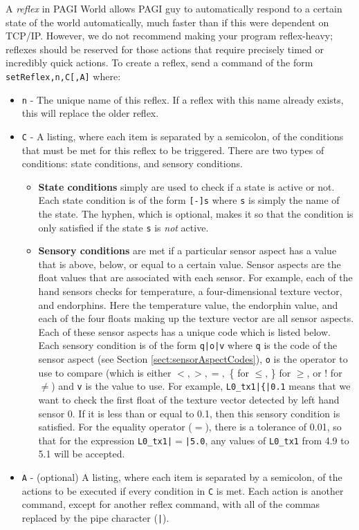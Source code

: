 A \textit{reflex} in PAGI World allows PAGI guy to automatically respond to a certain state of the world automatically, much faster than if this were dependent on TCP/IP. However, we do not recommend making your program reflex-heavy; reflexes should be reserved for those actions that require precisely timed or incredibly quick actions. To create a reflex, send a command of the form \texttt{setReflex,n,C[,A]} where:

\begin{itemize}
\item \texttt{n} - The unique name of this reflex. If a reflex with this name already exists, this will replace the older reflex.
\item \texttt{C} - A listing, where each item is separated by a semicolon, of the conditions that must be met for this reflex to be triggered. There are two types of conditions: state conditions, and sensory conditions. 
	\begin{itemize}
	\item \textbf{State conditions} simply are used to check if a state is active or not. Each state condition is of the form \texttt{[-]s} where \texttt{s} is simply the name of the state. The hyphen, which is optional, makes it so that the condition is only satisfied if the state \texttt{s} is \textit{not} active.
	\item \textbf{Sensory conditions} are met if a particular sensor aspect has a value that is above, below, or equal to a certain value. Sensor aspects are the float values that are associated with each sensor. For example, each of the hand sensors checks for temperature, a four-dimensional texture vector, and endorphins. Here the temperature value, the endorphin value, and each of the four floats making up the texture vector are all sensor aspects. Each of these sensor aspects has a unique code which is listed below.\\
	Each sensory condition is of the form \texttt{q|o|v} where \texttt{q} is the code of the sensor aspect (see Section \ref{sect:sensorAspectCodes}), \texttt{o} is the operator to use to compare (which is either $<, >, =,$ \{ for $\leq$, \} for $\geq$, or ! for $\neq$) and \texttt{v} is the value to use. For example, \texttt{L0\_tx1|\{|0.1} means that we want to check the first float of the texture vector detected by left hand sensor 0. If it is less than or equal to 0.1, then this sensory condition is satisfied. For the equality operator ($=$), there is a tolerance of 0.01, so that for the expression \texttt{L0\_tx1|$=$|5.0}, any values of \texttt{L0\_tx1} from 4.9 to 5.1 will be accepted.
	\end{itemize}
\item \texttt{A} - (optional) A listing, where each item is separated by a semicolon, of the actions to be executed if every condition in \texttt{C} is met. Each action is another command, except for another reflex command, with all of the commas replaced by the pipe character (\texttt{|}).
\end{itemize}

